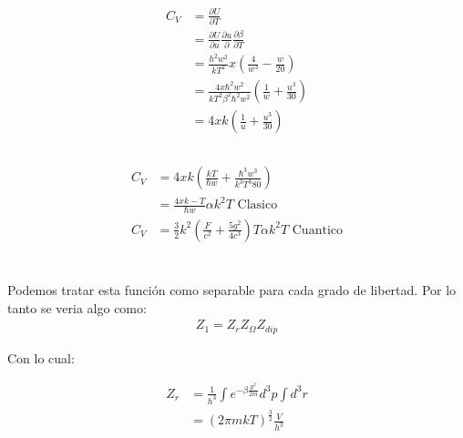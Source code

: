\documentclass{report}
\begin{document}
\section{}

\begin{align*}
	C_V &= \frac{\partial U}{\partial T}\\
	&= \frac{\partial U}{\partial u}\frac{\partial u}{\partial} \frac{\partial \beta}{\partial T}\\
	&= \frac{h^2 w^2}{kT^2} x \left( \frac{4}{w^3} - \frac{w}{20} \right)\\
	&= \frac{4 x\hbar^2 w^2}{kT^2 \beta^2 \hbar^2 w^2} \left( \frac{1}{w} + \frac{u^3}{30} \right)\\
	&= 4x k \left( \frac{1}{u} + \frac{u^3}{30} \right)
\end{align*}

\section{}

\begin{align*}
	C_V &= 4x k \left( \frac{kT}{\hbar w} + \frac{\hbar^3 w^3}{k^3 T^3 80}\right)\\
	&= \frac{4x k - T}{\hbar w}\alpha k^2 T \text{ Clasico}\\
	C_V &= \frac{3}{2} k^2 \left( \frac{F}{c^2} + \frac{5g^2}{4c^3} \right)T \alpha k^2 T\text{ Cuantico}
\end{align*}


\chapter{}

\section{}

Podemos tratar esta función como separable para cada grado de libertad. Por lo
tanto se veria algo como:
\begin{align*}
	Z_1 = Z_r Z_\Omega Z_{dip}
\end{align*}

Con lo cual:

\begin{align*}
	Z_r &= \frac{1}{h^3} \int e^{-\beta \frac{p^2}{2m}} d^3p \int d^3 r\\
	&= \left( 2\pi m k T \right)^{\frac{3}{2}} \frac{V}{h^3}
\end{align*}
\end{document}
